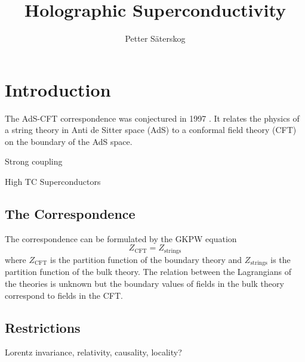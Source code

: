 \documentclass[12pt]{report}
\title{Holographic Superconductivity}
\author{Petter Säterskog}
\begin{document}
\maketitle
\tableofcontents
\chapter{Introduction}
The AdS-CFT correspondence was conjectured in 1997 \cite{Maldacena:1997re}. It relates the physics of a string theory in Anti de Sitter space (AdS) to a conformal field theory (CFT) on the boundary of the AdS space.

Strong coupling

High TC Superconductors
\section{The Correspondence}
The correspondence can be formulated by the GKPW equation \cite{Witten:1998qj}
\begin{equation}
 Z_{\text{CFT}}=Z_{\text{strings}}
\label{GKPW}
\end{equation}
where $Z_{\text{CFT}}$ is the partition function of the boundary theory and $Z_{\text{strings}}$ is the partition function of the bulk theory. The relation between the Lagrangians of the theories is unknown but the boundary values of fields in the bulk theory correspond to fields in the CFT.
\section{Restrictions}
Lorentz invariance, relativity, causality, locality?
\end{document}
